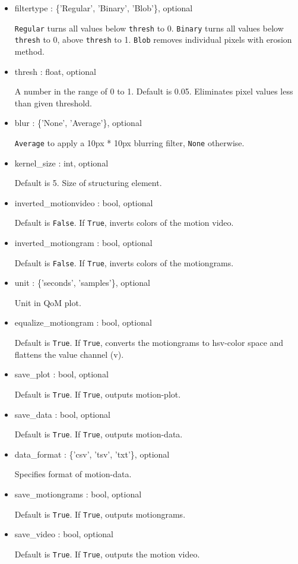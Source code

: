 \documentclass[9pt]{extarticle}
\def\code#1{\texttt{#1}}
\begin{document}
\begin{itemize}

\item filtertype : \{'Regular', 'Binary', 'Blob'\}, optional

\code{Regular} turns all values below \code{thresh} to 0.
\code{Binary} turns all values below \code{thresh} to 0, 
above \code{thresh} to 1. \code{Blob} removes individual pixels 
with erosion method.

\item thresh : float, optional

A number in the range of 0 to 1. Default is 0.05.
Eliminates pixel values less than given threshold.

\item blur : \{'None', 'Average'\}, optional

\code{Average} to apply a 10px * 10px blurring filter, \code{None}
otherwise.

\item kernel\_size : int, optional

Default is 5. Size of structuring element.

\item inverted\_motionvideo : bool, optional

Default is \code{False}. If \code{True}, inverts colors 
of the motion video.

\item inverted\_motiongram : bool, optional

Default is \code{False}. If \code{True}, inverts colors 
of the motiongrams.

\item unit : \{'seconds', 'samples'\}, optional

Unit in QoM plot.

\item equalize\_motiongram : bool, optional

Default is \code{True}. If \code{True}, converts the 
motiongrams to hsv-color space and flattens the value 
channel (v).

\item save\_plot : bool, optional

Default is \code{True}. If \code{True}, outputs motion-plot.

\item save\_data : bool, optional

Default is \code{True}. If \code{True}, outputs motion-data.

\item data\_format : \{'csv', 'tsv', 'txt'\}, optional

Specifies format of motion-data.

\item save\_motiongrams : bool, optional

Default is \code{True}. If \code{True}, outputs motiongrams.

\item save\_video : bool, optional

Default is \code{True}. If \code{True}, outputs the motion video.

\end{itemize}
\end{document}

